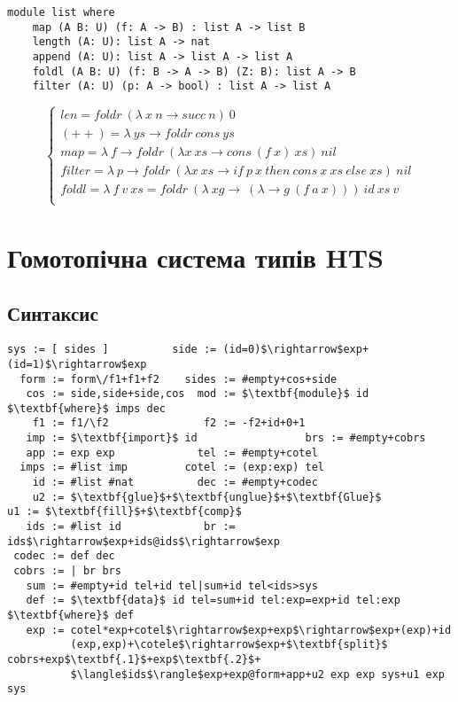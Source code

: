 \begin{lstlisting}[mathescape=true]
module list where
    map (A B: U) (f: A -> B) : list A -> list B
    length (A: U): list A -> nat
    append (A: U): list A -> list A -> list A
    foldl (A B: U) (f: B -> A -> B) (Z: B): list A -> B
    filter (A: U) (p: A -> bool) : list A -> list A
\end{lstlisting}
$$
\begin{cases}
len = foldr\ (\lambda\ x\ n \rightarrow succ\ n)\ 0\\
(++) = \lambda\ ys \rightarrow foldr\ cons\ ys\\
map = \lambda\ f \rightarrow foldr\ (\lambda x\ xs \rightarrow cons\ (f\ x)\ xs)\ nil\\
filter = \lambda\ p \rightarrow foldr\ (\lambda x\ xs \rightarrow if\ p\ x\ then\ cons\ x\ xs\ else\ xs)\ nil\\
foldl = \lambda\ f\ v\ xs = foldr\ (\lambda\ xg\rightarrow\ (\lambda \rightarrow g\ (f\ a\ x)))\ id\ xs\ v\\
\end{cases}
$$

\section{Гомотопічна система типів HTS}

\subsection{Синтаксис}

\begin{lstlisting}[mathescape=true]
   sys := [ sides ]          side := (id=0)$\rightarrow$exp+(id=1)$\rightarrow$exp
  form := form\/f1+f1+f2    sides := #empty+cos+side
   cos := side,side+side,cos  mod := $\textbf{module}$ id $\textbf{where}$ imps dec
    f1 := f1/\f2               f2 := -f2+id+0+1
   imp := $\textbf{import}$ id                 brs := #empty+cobrs
   app := exp exp             tel := #empty+cotel
  imps := #list imp         cotel := (exp:exp) tel
    id := #list #nat          dec := #empty+codec
    u2 := $\textbf{glue}$+$\textbf{unglue}$+$\textbf{Glue}$                   u1 := $\textbf{fill}$+$\textbf{comp}$
   ids := #list id             br := ids$\rightarrow$exp+ids@ids$\rightarrow$exp
 codec := def dec
 cobrs := | br brs
   sum := #empty+id tel+id tel|sum+id tel<ids>sys
   def := $\textbf{data}$ id tel=sum+id tel:exp=exp+id tel:exp $\textbf{where}$ def
   exp := cotel*exp+cotel$\rightarrow$exp+exp$\rightarrow$exp+(exp)+id
          (exp,exp)+\cotele$\rightarrow$exp+$\textbf{split}$ cobrs+exp$\textbf{.1}$+exp$\textbf{.2}$+
          $\langle$ids$\rangle$exp+exp@form+app+u2 exp exp sys+u1 exp sys
\end{lstlisting}

